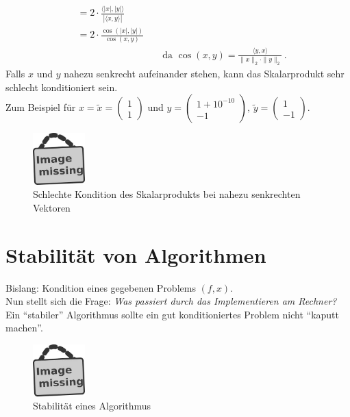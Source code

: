 \documentclass[ngerman,fontsize=11pt, paper=a4, parskip=half, titlepage=true, toc=bib]{scrbook}
\newcommand{\sectione}[1]{\section{#1} \setcounter{equation}{0}}
\begin{document}
\begin{enumerate}[a)]
\begin{align*}
                                                         &= 2\cdot \frac{\langle |x|,|y|\rangle}{|\langle x,y\rangle|} \\
                                                         &= 2 \cdot \frac{\cos(|x|, |y|)}{\cos(x,y)}  \\
                                                         &&&				\text{	da  }\cos(x,y) = \frac{\langle y,x \rangle}{\|x\|_2 \cdot \|y\|_2} \, . 
    \end{align*}
    Falls $x$ und $y$ nahezu senkrecht aufeinander stehen, kann das Skalarprodukt sehr schlecht konditioniert sein. \\
    Zum Beispiel für $x=\widetilde{x} = \begin{pmatrix} 1 \\1 \end{pmatrix}$
    und $y=\begin{pmatrix} 1+10^{-10} \\-1 \end{pmatrix},
    \, \widetilde{y}=\begin{pmatrix} 1 \\-1 \end{pmatrix}$. \\
    \begin{figure}
      \parbox{\linewidth}{
        \centering
        \includegraphics[width=2cm]{images/image_missing.jpg}
      }
      \caption{Schlechte Kondition des Skalarprodukts bei nahezu senkrechten Vektoren}
    \end{figure}
  \end{enumerate}

  \sectione{Stabilität von Algorithmen}
  Bislang: Kondition eines gegebenen Problems $(f,x)$. \\
  Nun stellt sich die Frage: \textit{Was passiert durch das Implementieren am Rechner? }\\
  Ein \enquote{stabiler} Algorithmus sollte ein gut konditioniertes Problem nicht \enquote{kaputt machen}.\\

  \begin{figure}
    \parbox{\linewidth}{
      \centering
      \includegraphics[width=2cm]{images/image_missing.jpg}
    }
    \caption{Stabilität eines Algorithmus}
  \end{figure}
\end{document}
